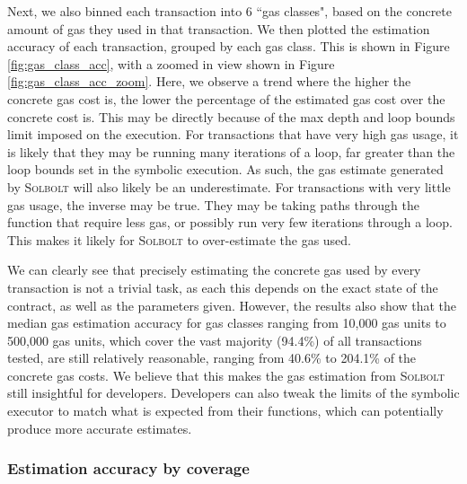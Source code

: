 Next, we also binned each transaction into 6 ``gas classes", based on the concrete amount of 
gas they used in that transaction. We then plotted the estimation accuracy of each transaction, 
grouped by each gas class. This is shown in Figure \ref{fig:gas_class_acc}, with a zoomed in view
shown in Figure \ref{fig:gas_class_acc_zoom}. Here, we observe a trend where the higher the
concrete gas cost is, the lower the percentage of the estimated gas cost over the concrete cost is.
This may be directly because of the max depth and loop bounds limit imposed on the execution.
For transactions that have very high gas usage, it is likely that they may be running many iterations
of a loop, far greater than the loop bounds set in the symbolic execution. As such, the gas
estimate generated by \textcolor{NavyBlue}{\textsc{Solbolt}} will also likely be an underestimate. For transactions with very
little gas usage, the inverse may be true. They may be taking paths through the function that require
less gas, or possibly run very few iterations through a loop. This makes it likely for \textcolor{NavyBlue}{\textsc{Solbolt}}
to over-estimate the gas used. 

We can clearly see that precisely estimating the concrete gas used
by every transaction is not a trivial task, as each this depends on the exact state of the contract, 
as well as the parameters given. However, the results also show that the
median gas estimation accuracy for gas classes ranging from 10,000 gas units to 500,000 gas units,
which cover the vast majority (94.4\%) of all transactions tested,
are still relatively reasonable, ranging from 40.6\% to 204.1\% of the concrete gas costs. 
We believe that this makes the gas estimation from \textcolor{NavyBlue}{\textsc{Solbolt}} still insightful for developers.
Developers can also tweak the limits of the symbolic executor to match what is expected
from their functions, which can potentially produce more accurate estimates.

\subsubsection{Estimation accuracy by coverage}

